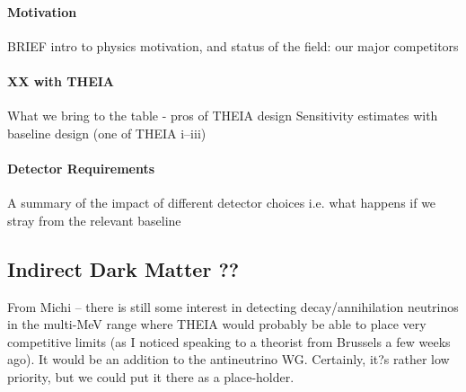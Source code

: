 \documentclass[11pt,prd,letterpaper,amsmath,amssymb,final,nofootinbib
,unsortedaddress,superscriptaddress
]{revtex4-1}
\begin{document}
\paragraph{Motivation}
BRIEF intro to physics motivation, and status of the field: our major competitors
\paragraph{XX with THEIA}
What we bring to the table - pros of THEIA design \newline
Sensitivity estimates with baseline design (one of THEIA i--iii)
\paragraph{Detector Requirements}
A summary of the impact of different detector choices i.e. what happens if we stray from the relevant baseline








\subsection{Indirect Dark Matter ?? }
From Michi -- there is still some interest in detecting decay/annihilation neutrinos in the multi-MeV range where THEIA would probably be able to place very competitive limits (as I noticed speaking to a theorist from Brussels a few weeks ago). It would be an addition to the antineutrino WG. Certainly, it?s rather low priority, but we could put it there as a place-holder.
\end{document}
